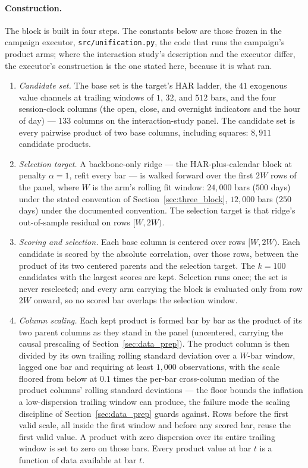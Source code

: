 \paragraph{Construction.} The block is built in four steps. The constants
below are those frozen in the campaign executor,
\texttt{src/unification.py}, the code that runs the campaign's product
arms; where the interaction study's description and the executor differ,
the executor's construction is the one stated here, because it is what
ran.
\begin{enumerate}
    \item \emph{Candidate set.} The base set is the target's HAR ladder,
    the $41$ exogenous value channels at trailing windows of $1$, $32$,
    and $512$ bars, and the four session-clock columns (the open, close,
    and overnight indicators and the hour of day) --- $133$ columns on
    the interaction-study panel. The candidate set is every pairwise
    product of two base columns, including squares: $8{,}911$ candidate
    products.
    \item \emph{Selection target.} A backbone-only ridge --- the
    HAR-plus-calendar block at penalty $\alpha = 1$, refit every bar ---
    is walked forward over the first $2W$ rows of the panel, where $W$ is
    the arm's rolling fit window: $24{,}000$ bars ($500$ days) under the
    stated convention of Section~\ref{sec:three_block}, $12{,}000$ bars
    ($250$ days) under the documented convention. The selection target is
    that ridge's out-of-sample residual on rows $[W, 2W)$.
    \item \emph{Scoring and selection.} Each base column is centered over
    rows $[W, 2W)$. Each candidate is scored by the absolute correlation,
    over those rows, between the product of its two centered parents and
    the selection target. The $k = 100$ candidates with the largest
    scores are kept. Selection runs once; the set is never reselected;
    and every arm carrying the block is evaluated only from row $2W$
    onward, so no scored bar overlaps the selection window.
    \item \emph{Column scaling.} Each kept product is formed bar by bar
    as the product of its two parent columns as they stand in the panel
    (uncentered, carrying the causal prescaling of
    Section~\ref{sec:data_prep}). The product column is then divided by
    its own trailing rolling standard deviation over a $W$-bar window,
    lagged one bar and requiring at least $1{,}000$ observations, with
    the scale floored from below at $0.1$ times the per-bar cross-column
    median of the product columns' rolling standard deviations --- the
    floor bounds the inflation a low-dispersion trailing window can
    produce, the failure mode the scaling discipline of
    Section~\ref{sec:data_prep} guards against. Rows before the first
    valid scale, all inside the first window and before any scored bar,
    reuse the first valid value. A product with zero dispersion over its
    entire trailing window is set to zero on those bars. Every product
    value at bar $t$ is a function of data available at bar $t$.
\end{enumerate}

